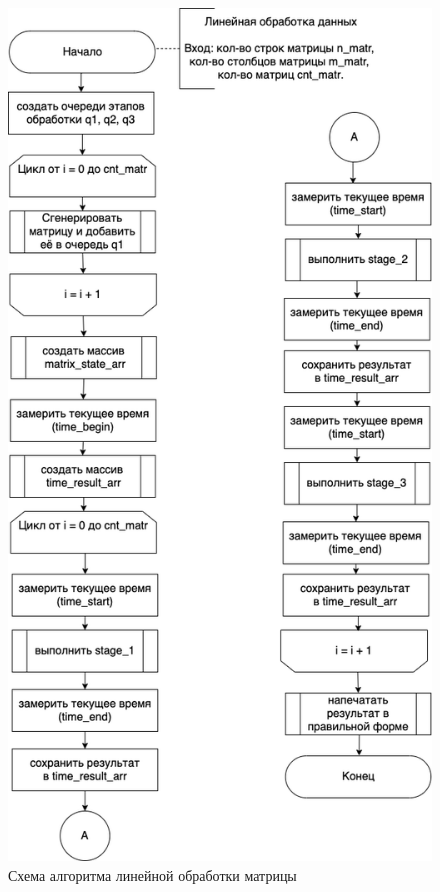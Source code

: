 \begin{figure}[h]
	\centering
	\includegraphics[scale=0.55]{img/linear_processing.png}
	\caption{Схема алгоритма линейной обработки матрицы}
	\label{fig:linear_processing}
\end{figure}

